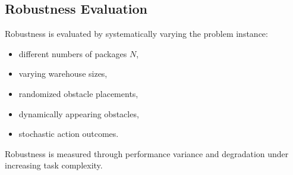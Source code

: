 \documentclass{article}
\begin{document}
\subsection{Robustness Evaluation}

Robustness is evaluated by systematically varying the problem instance:

\begin{itemize}
    \item different numbers of packages $N$,
    \item varying warehouse sizes,
    \item randomized obstacle placements,
    \item dynamically appearing obstacles,
    \item stochastic action outcomes.
\end{itemize}

Robustness is measured through performance variance and degradation under increasing task complexity.
\end{document}
